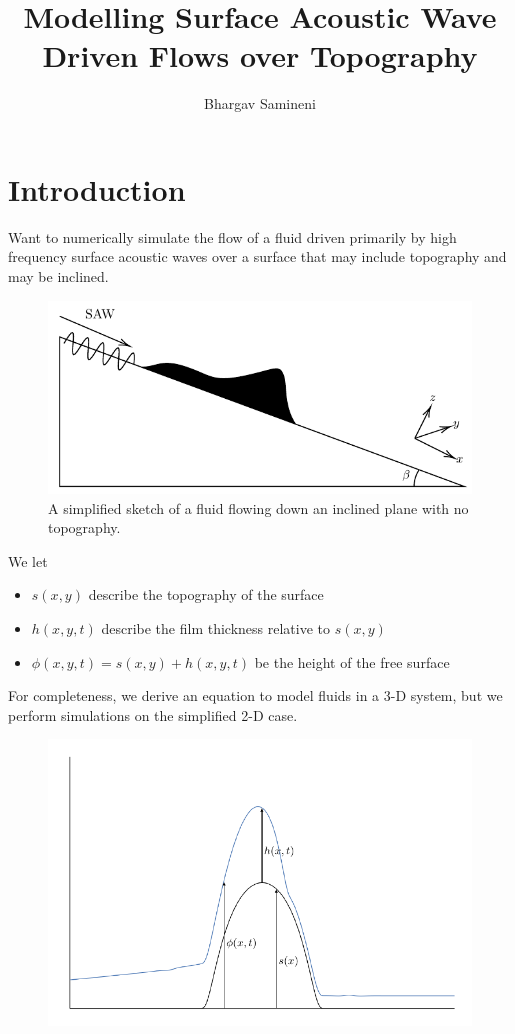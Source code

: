 \documentclass[compress, xcolor=dvipsnames]{beamer}
\title{Modelling Surface Acoustic Wave Driven Flows over Topography}
\author{Bhargav Samineni}
\newcommand{\func}[2]{\ensuremath{#1\!\lrp{#2}}}
\newcommand{\lrp}[1]{\left( #1 \right)}
\begin{document}
   
    \frame{\titlepage}     

    \section{Introduction}
    \begin{frame}
        Want to numerically simulate the flow of a fluid driven primarily by 
        high frequency surface acoustic waves over a surface that may include topography
        and may be inclined. 

        \begin{figure}[hb]
            \centering
            \includegraphics[width=.75\textwidth]{images/samp_diagram.pdf}
            \caption{A simplified sketch of a fluid flowing down an inclined plane with no topography.}
            \label{fig:model_diagram}
        \end{figure}
    \end{frame}
    \begin{frame} 
        We let
        \begin{itemize}
            \item $\func{s}{x, y}$ describe the topography of the surface
            \item $\func{h}{x,y,t}$ describe the film thickness relative to $\func{s}{x,y}$ 
            \item $\func{\phi}{x,y,t} = \func{s}{x,y} + \func{h}{x,y,t}$ be the height of the free surface
        \end{itemize}

        For completeness, we derive an equation to model fluids in a 
        3-D system, but we perform simulations on the simplified 2-D case. 
        \begin{figure}
            \centering
            \includegraphics[width=.6\textwidth]{images/funcs_diagram.pdf}
        \end{figure}
    \end{frame}
\end{document}
